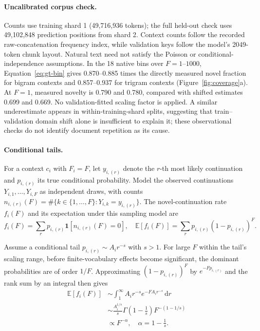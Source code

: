 \paragraph{Uncalibrated corpus check.}
Counts use training shard 1 (49,716,936 tokens); the full held-out check uses 49,102,848 prediction positions from shard 2. Context counts follow the recorded raw-concatenation frequency index, while validation keys follow the model's 2049-token chunk layout. Natural text need not satisfy the Poisson or conditional-independence assumptions. In the 18 native bins over $F=1$--$1000$, Equation~\eqref{eq:gt-bin} gives 0.870--0.885 times the directly measured novel fraction for bigram contexts and 0.857--0.937 for trigram contexts (Figure~\ref{fig:coverage}a). At $F=1$, measured novelty is 0.790 and 0.780, compared with shifted estimates 0.699 and 0.669. No validation-fitted scaling factor is applied. A similar underestimate appears in within-training-shard splits, suggesting that train--validation domain shift alone is insufficient to explain it; these observational checks do not identify document repetition as its cause.

\paragraph{Conditional tails.}
For a context $c_i$ with $F_i=F$, let $y_{i,(r)}$ denote the $r$-th most likely continuation and $p_{i,(r)}$ its true conditional probability. Model the observed continuations $Y_{i,1},\ldots,Y_{i,F}$ as independent draws, with counts $n_{i,(r)}(F)=\#\{k\in\{1,\ldots,F\}:Y_{i,k}=y_{i,(r)}\}$. The novel-continuation rate $f_i(F)$ and its expectation under this sampling model are
\begin{equation}
f_i(F)=\sum_r p_{i,(r)}
\mathbf{1}\left[n_{i,(r)}(F)=0\right],
\quad
\mathbb{E}[f_i(F)]=\sum_r p_{i,(r)}(1-p_{i,(r)})^F.
\end{equation}

Assume a conditional tail $p_{i,(r)}\sim A_i r^{-s}$ with $s>1$. For large $F$ within the tail's scaling range, before finite-vocabulary effects become significant, the dominant probabilities are of order $1/F$. Approximating $(1-p_{i,(r)})^F$ by $e^{-Fp_{i,(r)}}$ and the rank sum by an integral then gives
\citep{gnedin2007occupancy}
\begin{equation}
\begin{aligned}
\mathbb{E}[f_i(F)]
&\sim
\int_1^\infty A_i r^{-s}e^{-F A_i r^{-s}}\,\mathrm{d}r\\
&\sim
\frac{A_i^{1/s}}{s}
\Gamma\left(1-\frac{1}{s}\right)
F^{-(1-1/s)}\\
&\propto F^{-\alpha},
\quad
\alpha=1-\frac{1}{s}.
\end{aligned}
\label{eq:occupancy}
\end{equation}

